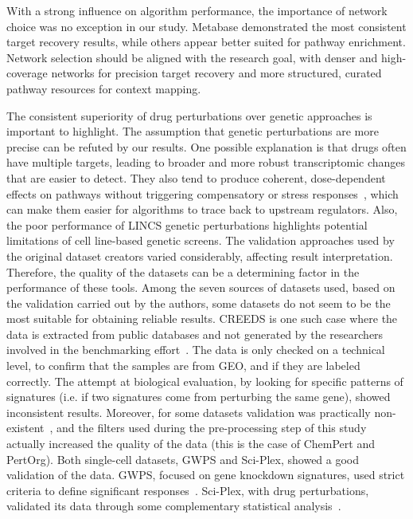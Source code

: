 With a strong influence on algorithm performance, the importance of network choice was no exception in our study. 
Metabase demonstrated the most consistent target recovery results, while others appear better suited for pathway enrichment. 
Network selection should be aligned with the research goal, with denser and high-coverage networks for precision target recovery and more structured, curated pathway resources for context mapping.

The consistent superiority of drug perturbations over genetic approaches is important to highlight. 
The assumption that genetic perturbations are more precise can be refuted by our results. 
One possible explanation is that drugs often have multiple targets, leading to broader and more robust transcriptomic changes that are easier to detect.
They also tend to produce coherent, dose-dependent effects on pathways without triggering compensatory or stress responses~\cite{RNMellis}, which can make them easier for algorithms to trace back to upstream regulators.
Also, the poor performance of \gls{LINCS} genetic perturbations highlights potential limitations of cell line-based genetic screens.
The validation approaches used by the original dataset creators varied considerably, affecting result interpretation. Therefore, the quality of the datasets can be a determining factor in the performance of these tools. 
Among the seven sources of datasets used, based on the validation carried out by the authors, some datasets do not seem to be the most suitable for obtaining reliable results. 
\gls{CREEDS} is one such case where the data is extracted from public databases and not generated by the researchers involved in the benchmarking effort~\cite{RN87}. 
The data is only checked on a technical level, to confirm that the samples are from \gls{GEO}, and if they are labeled correctly. 
The attempt at biological evaluation, by looking for specific patterns of signatures (i.e. if two signatures come from perturbing the same gene), showed inconsistent results. 
Moreover, for some datasets validation was practically non-existent~\cite{RN85, RN86}, and the filters used during the pre-processing step of this study actually increased the quality of the data (this is the case of ChemPert and PertOrg). 
Both single-cell datasets, \gls{GWPS} and Sci-Plex, showed a good validation of the data. \gls{GWPS}, focused on gene knockdown signatures, used strict criteria to define significant responses~\cite{RN89}. 
Sci-Plex, with drug perturbations, validated its data through some complementary statistical analysis~\cite{RN88}. 
